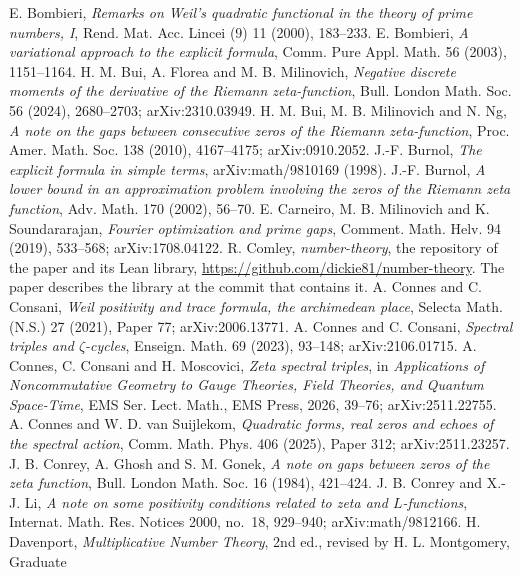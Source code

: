  E. Bombieri, \emph{Remarks on Weil's quadratic functional in the theory of prime numbers, I}, Rend.
  Mat. Acc. Lincei (9) 11 (2000), 183--233.
 E. Bombieri, \emph{A variational approach to the explicit formula}, Comm. Pure Appl. Math. 56
  (2003), 1151--1164.
 H. M. Bui, A. Florea and M. B. Milinovich, \emph{Negative discrete moments of the derivative of the
  Riemann zeta-function}, Bull. London Math. Soc. 56 (2024), 2680--2703; arXiv:2310.03949.
 H. M. Bui, M. B. Milinovich and N. Ng, \emph{A note on the gaps between consecutive zeros of the Riemann
  zeta-function}, Proc. Amer. Math. Soc. 138 (2010), 4167--4175; arXiv:0910.2052.
 J.-F. Burnol, \emph{The explicit formula in simple terms}, arXiv:math/9810169 (1998).
 J.-F. Burnol, \emph{A lower bound in an approximation problem involving the zeros of the Riemann zeta
  function}, Adv. Math. 170 (2002), 56--70.
 E. Carneiro, M. B. Milinovich and K. Soundararajan, \emph{Fourier optimization and prime gaps}, Comment.
  Math. Helv. 94 (2019), 533--568; arXiv:1708.04122.
 R. Comley, \emph{number-theory}, the repository of the paper and its Lean library,
  \url{https://github.com/dickie81/number-theory}. The paper describes the library at the commit that contains it.
 A. Connes and C. Consani, \emph{Weil positivity and trace formula, the archimedean place},
  Selecta Math. (N.S.) 27 (2021), Paper 77; arXiv:2006.13771.
 A. Connes and C. Consani, \emph{Spectral triples and $\zeta$-cycles}, Enseign. Math. 69
  (2023), 93--148; arXiv:2106.01715.
 A. Connes, C. Consani and H. Moscovici, \emph{Zeta spectral triples}, in \emph{Applications of
  Noncommutative Geometry to Gauge Theories, Field Theories, and Quantum Space-Time}, EMS Ser. Lect. Math., EMS Press,
  2026, 39--76; arXiv:2511.22755.
 A. Connes and W. D. van Suijlekom, \emph{Quadratic forms, real zeros and echoes of the
  spectral action}, Comm. Math. Phys. 406 (2025), Paper 312; arXiv:2511.23257.
 J. B. Conrey, A. Ghosh and S. M. Gonek, \emph{A note on gaps between zeros of the zeta function}, Bull.
  London Math. Soc. 16 (1984), 421--424.
 J. B. Conrey and X.-J. Li, \emph{A note on some positivity conditions related to zeta and
  $L$-functions}, Internat. Math. Res. Notices 2000, no.~18, 929--940; arXiv:math/9812166.
 H. Davenport, \emph{Multiplicative Number Theory}, 2nd ed., revised by H. L. Montgomery, Graduate
